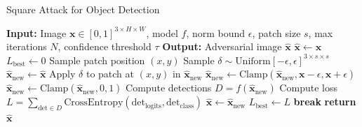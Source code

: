 \documentclass[../main.tex]{subfiles}
\begin{document}
\begin{breakablealgorithm}{Square Attack for Object Detection}
\label{alg:square_attack}
\begin{algorithmic}[1]
\State \textbf{Input:} Image $\mathbf{x} \in [0,1]^{3 \times H \times W}$, model $f$, norm bound $\epsilon$, patch size $s$, max iterations $N$, confidence threshold $\tau$
\State \textbf{Output:} Adversarial image $\hat{\mathbf{x}}$
\State $\hat{\mathbf{x}} \gets \mathbf{x}$ 
\State $L_{\text{best}} \gets 0$ 
    \State Sample patch position $(x, y)$ 
    \State Sample $\delta \sim \text{Uniform}[-\epsilon, \epsilon]^{3 \times s \times s}$
    \State $\hat{\mathbf{x}}_{\text{new}} \gets \hat{\mathbf{x}}$
    \State Apply $\delta$ to patch at $(x, y)$ in $\hat{\mathbf{x}}_{\text{new}}$
    \State $\hat{\mathbf{x}}_{\text{new}} \gets \text{Clamp}(\hat{\mathbf{x}}_{\text{new}}, \mathbf{x} - \epsilon, \mathbf{x} + \epsilon)$ 
    \State $\hat{\mathbf{x}}_{\text{new}} \gets \text{Clamp}(\hat{\mathbf{x}}_{\text{new}}, 0, 1)$
    \State Compute detections $D = f(\hat{\mathbf{x}}_{\text{new}})$
    \State Compute loss $L = \sum_{\text{det} \in D} \text{CrossEntropy}(\text{det}_{\text{logits}}, \text{det}_{\text{class}})$
     
        \State $\hat{\mathbf{x}} \gets \hat{\mathbf{x}}_{\text{new}}$
        \State $L_{\text{best}} \gets L$
    \EndIf
     
        \State \textbf{break}
    \EndIf
\EndFor
\State \textbf{return} $\hat{\mathbf{x}}$
\end{algorithmic}
\end{breakablealgorithm}
\end{document}
